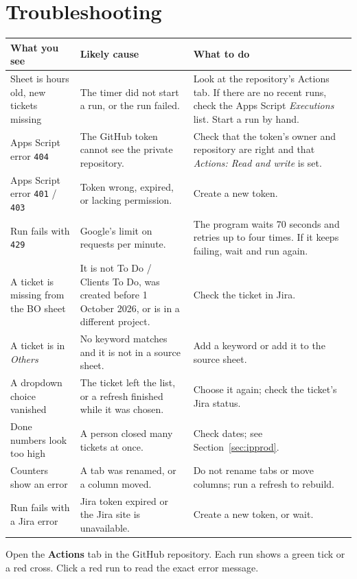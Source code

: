 \documentclass[11pt,a4paper]{article}
\newcommand{\code}[1]{\texttt{#1}}
\let\oldsection\section
\renewcommand{\section}{\needspace{12\baselineskip}\oldsection}
\begin{document}
\section{Troubleshooting}

\begin{longtable}{@{}p{4.4cm} p{4.5cm} p{5.3cm}@{}}
\toprule
\textbf{What you see} & \textbf{Likely cause} & \textbf{What to do} \\
\midrule
\endhead
Sheet is hours old, new tickets missing & The timer did not start a run, or the run failed. &
Look at the repository's Actions tab. If there are no recent runs, check the Apps Script \emph{Executions} list. Start a
run by hand. \\
Apps Script error \code{404} & The GitHub token cannot see the private repository. &
Check that the token's owner and repository are right and that \emph{Actions: Read and write} is set. \\
Apps Script error \code{401} / \code{403} & Token wrong, expired, or lacking permission. & Create a new token. \\
Run fails with \code{429} & Google's limit on requests per minute. &
The program waits 70 seconds and retries up to four times. If it keeps failing, wait and run again. \\
A ticket is missing from the BO sheet & It is not To Do / Clients To Do, was created before 1 October 2026, or is in a
different project. & Check the ticket in Jira. \\
A ticket is in \emph{Others} & No keyword matches and it is not in a source sheet. & Add a keyword or add it to the
source sheet. \\
A dropdown choice vanished & The ticket left the list, or a refresh finished while it was chosen. &
Choose it again; check the ticket's Jira status. \\
Done numbers look too high & A person closed many tickets at once. & Check dates; see Section~\ref{sec:ipprod}. \\
Counters show an error & A tab was renamed, or a column moved. & Do not rename tabs or move columns; run a refresh to rebuild. \\
Run fails with a Jira error & Jira token expired or the Jira site is unavailable. & Create a new token, or wait. \\
\bottomrule
\end{longtable}

\begin{note}
Open the \textbf{Actions} tab in the GitHub repository. Each run shows a green tick or a red cross. Click a red run to
read the exact error message.
\end{note}
\end{document}
